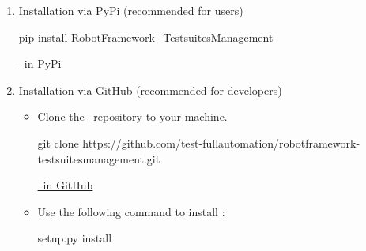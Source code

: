 \begin{enumerate}

\item Installation via PyPi (recommended for users)
\begin{pythonlog}
pip install RobotFramework_TestsuitesManagement
\end{pythonlog}

\href{https://pypi.org/project/robotframework-testsuitesmanagement}{\pkg\ in PyPi}

\item Installation via GitHub (recommended for developers)

\begin{itemize}
\item Clone the \repo\ repository to your machine.
\begin{pythonlog}
git clone https://github.com/test-fullautomation/robotframework-testsuitesmanagement.git
\end{pythonlog}

\href{https://github.com/test-fullautomation/robotframework-testsuitesmanagement}{\pkg\ in GitHub}

\vspace{2ex}

\item Use the following command to install \pkg:
\begin{pythonlog}
setup.py install
\end{pythonlog}

\end{itemize}
\end{enumerate}
